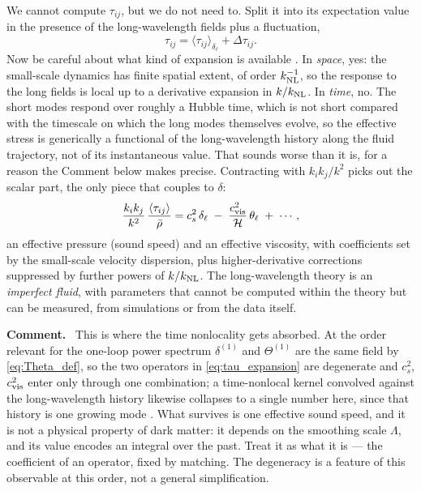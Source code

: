 \documentclass[a4paper,11pt]{article}
\def\cH{\mathcal{H}}
\def\knl{k_{\rm NL}}
\numberwithin{equation}{section}
\newenvironment{remark}
  {\par\medskip\noindent\begingroup\small\color{ForestGreen!60!black}\textbf{Comment.}\ }
  {\endgroup\par\medskip}
\begin{document}
We cannot compute $\tau_{ij}$, but we do not need to. Split it into its expectation value in the presence of the long-wavelength fields plus a fluctuation,
\begin{equation}
\tau_{ij} = \big\langle\tau_{ij}\big\rangle_{\delta_\ell} + \Delta\tau_{ij} .
\label{eq:tau_split}
\end{equation}
Now be careful about what kind of expansion is available \cite[\S 5]{Baumann2010}. In \emph{space}, yes: the small-scale dynamics has finite spatial extent, of order $\knl^{-1}$, so the response to the long fields is local up to a derivative expansion in $k/\knl$. In \emph{time}, no. The short modes respond over roughly a Hubble time, which is not short compared with the timescale on which the long modes themselves evolve, so the effective stress is generically a functional of the long-wavelength history along the fluid trajectory, not of its instantaneous value. That sounds worse than it is, for a reason the Comment below makes precise. Contracting with $k_ik_j/k^2$ picks out the scalar part, the only piece that couples to $\delta$:
\begin{equation}
\frac{k_ik_j}{k^2}\,\frac{\langle\tau_{ij}\rangle}{\bar\rho}
= c_s^2\,\delta_\ell \;-\; \frac{c_{\rm vis}^2}{\cH}\,\theta_\ell \;+\; \cdots ,
\label{eq:tau_expansion}
\end{equation}
an effective pressure (sound speed) and an effective viscosity, with coefficients set by the small-scale velocity dispersion, plus higher-derivative corrections suppressed by further powers of $k/\knl$. The long-wavelength theory is an \emph{imperfect fluid}, with parameters that cannot be computed within the theory but can be measured, from simulations or from the data itself.

\begin{remark}
This is where the time nonlocality gets absorbed. At the order relevant for the one-loop power spectrum $\delta^{(1)}$ and $\Theta^{(1)}$ are the same field by \eqref{eq:Theta_def}, so the two operators in \eqref{eq:tau_expansion} are degenerate and $c_s^2$, $c_{\rm vis}^2$ enter only through one combination; a time-nonlocal kernel convolved against the long-wavelength history likewise collapses to a single number here, since that history is one growing mode \cite{Carroll2013}. What survives is one effective sound speed, and it is not a physical property of dark matter: it depends on the smoothing scale $\Lambda$, and its value encodes an integral over the past. Treat it as what it is --- the coefficient of an operator, fixed by matching. The degeneracy is a feature of this observable at this order, not a general simplification.
\end{remark}
\end{document}
